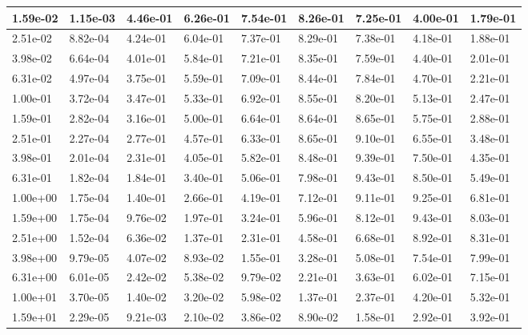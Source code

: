 \documentclass[review]{elsarticle}
\begin{document}
\begin{longtable}{|p{1.6cm}|l|l|l|l|l|l|l|l|}
	1.59e-02&1.15e-03&4.46e-01&6.26e-01&7.54e-01&8.26e-01&7.25e-01&4.00e-01&1.79e-01\\ \hline 
	2.51e-02&8.82e-04&4.24e-01&6.04e-01&7.37e-01&8.29e-01&7.38e-01&4.18e-01&1.88e-01\\ \hline 
	3.98e-02&6.64e-04&4.01e-01&5.84e-01&7.21e-01&8.35e-01&7.59e-01&4.40e-01&2.01e-01\\ \hline 
	6.31e-02&4.97e-04&3.75e-01&5.59e-01&7.09e-01&8.44e-01&7.84e-01&4.70e-01&2.21e-01\\ \hline 
	1.00e-01&3.72e-04&3.47e-01&5.33e-01&6.92e-01&8.55e-01&8.20e-01&5.13e-01&2.47e-01\\ \hline 
	1.59e-01&2.82e-04&3.16e-01&5.00e-01&6.64e-01&8.64e-01&8.65e-01&5.75e-01&2.88e-01\\ \hline 
	2.51e-01&2.27e-04&2.77e-01&4.57e-01&6.33e-01&8.65e-01&9.10e-01&6.55e-01&3.48e-01\\ \hline 
	3.98e-01&2.01e-04&2.31e-01&4.05e-01&5.82e-01&8.48e-01&9.39e-01&7.50e-01&4.35e-01\\ \hline 
	6.31e-01&1.82e-04&1.84e-01&3.40e-01&5.06e-01&7.98e-01&9.43e-01&8.50e-01&5.49e-01\\ \hline 
	1.00e+00&1.75e-04&1.40e-01&2.66e-01&4.19e-01&7.12e-01&9.11e-01&9.25e-01&6.81e-01\\ \hline 
	1.59e+00&1.75e-04&9.76e-02&1.97e-01&3.24e-01&5.96e-01&8.12e-01&9.43e-01&8.03e-01\\ \hline 
	2.51e+00&1.52e-04&6.36e-02&1.37e-01&2.31e-01&4.58e-01&6.68e-01&8.92e-01&8.31e-01\\ \hline 
	3.98e+00&9.79e-05&4.07e-02&8.93e-02&1.55e-01&3.28e-01&5.08e-01&7.54e-01&7.99e-01\\ \hline 
	6.31e+00&6.01e-05&2.42e-02&5.38e-02&9.79e-02&2.21e-01&3.63e-01&6.02e-01&7.15e-01\\ \hline 
	1.00e+01&3.70e-05&1.40e-02&3.20e-02&5.98e-02&1.37e-01&2.37e-01&4.20e-01&5.32e-01\\ \hline 
	1.59e+01&2.29e-05&9.21e-03&2.10e-02&3.86e-02&8.90e-02&1.58e-01&2.92e-01&3.92e-01\\ \hline 
	\hline 
\end{longtable}
\end{document}
